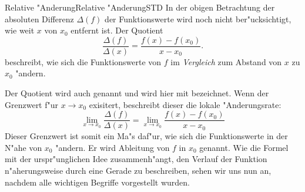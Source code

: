 \begin{MXContent}{Relative "Anderung}{Relative "Anderung}{STD}
In der obigen Betrachtung der absoluten Differenz $\Delta(f)$ der Funktionswerte 
wird noch nicht ber"ucksichtigt, wie weit $x$ von $x_0$ entfernt ist.  
Der Quotient
\[
\frac{\Delta(f)}{\Delta(x)} = \frac{f(x) - f(x_0)}{x - x_0}.
\]
beschreibt, wie sich die Funktionswerte von $f$ im \emph{Vergleich} zum Abstand 
von $x$ zu $x_0$ "andern. 

Der Quotient wird auch  genannt
und wird hier mit  
bezeichnet. 
Wenn der Grenzwert f"ur $x \to x_0$ exisitert, beschreibt dieser die lokale 
"Anderungsrate:
\[
\lim_{x \to x_0} \frac{\Delta(f)}{\Delta(x)} 
 = \lim_{x \to x_0} \frac{f(x) - f(x_0)}{x - x_0} %
\] 
Dieser Grenzwert ist somit ein Ma"s daf"ur, wie sich die 
Funktionswerte in der N"ahe von $x_0$ "andern. Er wird Ableitung von $f$ in 
$x_0$ genannt. Wie die Formel mit der urspr"unglichen Idee zusammenh"angt, 
den Verlauf der Funktion n"aherungsweise durch eine Gerade zu beschreiben,
sehen wir uns nun an, nachdem alle wichtigen Begriffe vorgestellt wurden.
\end{MXContent}


